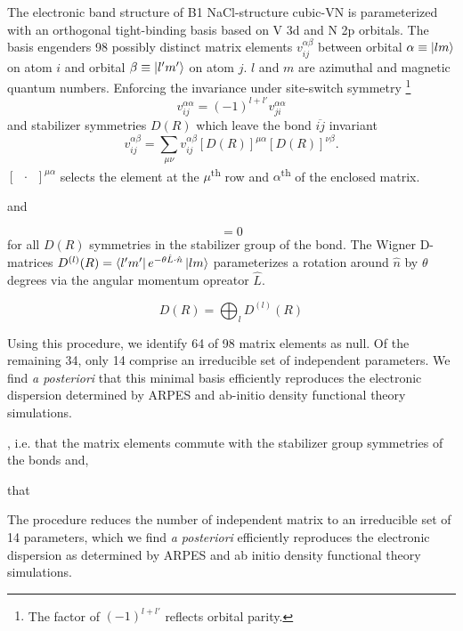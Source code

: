\documentclass[preprint,showpacs,preprintnumbers,superscriptaddress,prb,floatfix,aps]{revtex4-1}
\begin{document}
The electronic band structure of B1 NaCl-structure cubic-VN is parameterized with an orthogonal tight-binding basis based on V 3d and N 2p orbitals. The basis engenders 98 possibly distinct matrix elements $v_{ij}^{\alpha\beta}$ between orbital $\alpha \equiv \ket{lm}$ on atom $i$ and orbital $\beta \equiv \ket{l'm'}$ on atom $j$. $l$ and $m$ are azimuthal and magnetic quantum numbers. Enforcing the invariance under site-switch symmetry \footnote{The factor of $(-1)^{l+l'}$ reflects orbital parity.}
\begin{equation}
v_{ij}^{\alpha\alpha} = (-1)^{l+l'}v_{ji}^{\alpha\alpha}
\end{equation}
and stabilizer symmetries $D\left(R\right)$ which leave the bond $\overline{ij}$ invariant
\begin{equation}
v_{ij}^{\alpha\beta} = \sum_{\mu\nu} v_{ij}^{\alpha\beta} \left[ D\left(R\right) \right]^{\mu\alpha} \left[ D\left(R\right) \right]^{\nu\beta}.
\end{equation}
$\left[\phantom{a}\cdot\phantom{a}\right] ^{\mu\alpha}$ selects the element at the $\mu$\textsuperscript{th} row and $\alpha$\textsuperscript{th} of the enclosed matrix.


and 


\begin{equation}
[V,D(R)] = 0
\end{equation}
for all $D(R)$ symmetries in the stabilizer group of the bond. The Wigner D-matrices $D^{(l)}(R) =  \bra{l'm'} e^{-\theta\hat{L}\cdot\hat{n}}\ket{lm}$ parameterizes a rotation around $\hat{n}$ by $\theta$ degrees via the angular momentum opreator $\hat{L}$. %



\begin{equation}
D(R) = \bigoplus_l D^{(l)}(R)
\end{equation}

Using this procedure, we identify 64 of 98 matrix elements as null. Of the remaining 34, only 14 comprise an irreducible set of independent parameters. We find \emph{a posteriori} that this minimal basis efficiently reproduces the electronic dispersion determined by ARPES and ab-initio density functional theory simulations.

, i.e. that the matrix elements commute with the stabilizer group symmetries of the bonds and,

 that 

The procedure reduces the number of independent matrix to an irreducible set of 14 parameters, which we find \emph{a posteriori} efficiently reproduces the electronic dispersion as determined by ARPES and ab initio density functional theory simulations.
\end{document}

